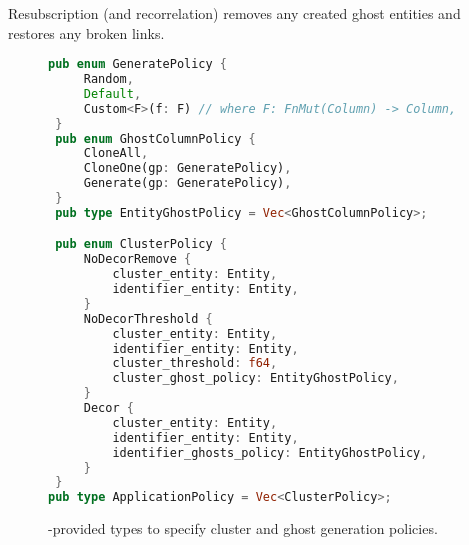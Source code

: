 Resubscription (and recorrelation) removes any created ghost entities and restores any broken links.


\begin{figure}
\begin{lstlisting}[language=Rust]
 pub enum GeneratePolicy {
     Random,
     Default,
     Custom<F>(f: F) // where F: FnMut(Column) -> Column,
 }
 pub enum GhostColumnPolicy {
     CloneAll,
     CloneOne(gp: GeneratePolicy),
     Generate(gp: GeneratePolicy),
 }
 pub type EntityGhostPolicy = Vec<GhostColumnPolicy>;

 pub enum ClusterPolicy {
     NoDecorRemove {
         cluster_entity: Entity,
         identifier_entity: Entity,
     }
     NoDecorThreshold {
         cluster_entity: Entity,
         identifier_entity: Entity,
         cluster_threshold: f64,
         cluster_ghost_policy: EntityGhostPolicy,
     }
     Decor {
         cluster_entity: Entity,
         identifier_entity: Entity,
         identifier_ghosts_policy: EntityGhostPolicy,
     }
 }
pub type ApplicationPolicy = Vec<ClusterPolicy>;
\end{lstlisting}
    \caption{\sys{}-provided types to specify cluster and ghost generation policies.}
\end{figure}



